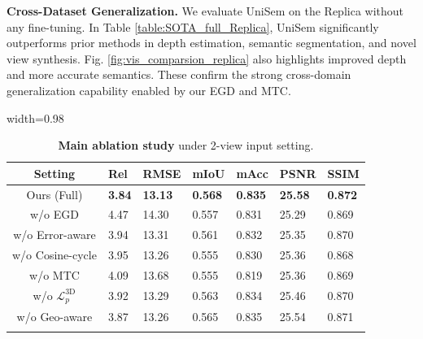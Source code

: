 \documentclass[runningheads]{llncs}
\begin{document}
\noindent
\textbf{Cross-Dataset Generalization.}
We evaluate UniSem on the Replica without any fine-tuning.
In Table \ref{table:SOTA_full_Replica}, UniSem significantly outperforms prior methods in depth estimation, semantic segmentation, and novel view synthesis. 
Fig. \ref{fig:vis_comparsion_replica} also highlights improved depth and more accurate semantics.
These confirm the strong cross-domain generalization capability enabled by our EGD and MTC.


\begin{table}[t]
\centering

\begin{minipage}[t]{0.48\textwidth}
  \vspace{0pt}
  \centering
  \caption{\textbf{Main ablation study} under 2-view input setting.}
  \label{table:ablation_main}
  \vspace{-3mm}
  \begin{adjustbox} {width=0.98\linewidth}
  \begin{tabular}{ c | p{0.9cm}<{\centering} p{1.0cm}<{\centering} p{1.0cm}<{\centering} p{1.0cm}<{\centering} p{1.0cm}<{\centering} p{1.0cm}<{\centering} }
    \Xhline{3\arrayrulewidth}
    Setting & Rel & RMSE & mIoU & mAcc & PSNR & SSIM \\
    \midrule[0.1pt]
    \rowcolor{lightblue} Ours (Full)
    & \textbf{3.84} & \textbf{13.13} & \textbf{0.568} & \textbf{0.835} & \textbf{25.58} & \textbf{0.872} \\
    \midrule[0.1pt]
    w/o EGD          & 4.47 & 14.30 & 0.557 & 0.831 & 25.29 & 0.869 \\
    w/o Error-aware  & 3.94 & 13.31 & 0.561 & 0.832 & 25.35 & 0.870 \\
    w/o Cosine-cycle & 3.95 & 13.26 & 0.555 & 0.830 & 25.36 & 0.868 \\
    \midrule[0.1pt]
    w/o MTC          & 4.09 & 13.68 & 0.555 & 0.819 & 25.36 & 0.869 \\
    w/o $\mathcal{L}^{\text{3D}}_p$ & 3.92 & 13.29 & 0.563 & 0.834 & 25.46 & 0.870 \\
    w/o Geo-aware    & 3.87 & 13.26 & 0.565 & 0.835 & 25.54 & 0.871 \\
    \Xhline{3\arrayrulewidth}
  \end{tabular}
  \end{adjustbox}
  

\end{minipage}
\end{table}
\end{document}
